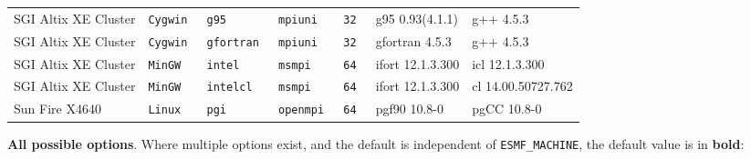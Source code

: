 \begin{tabular}{lllllll}
SGI Altix XE Cluster  &\tt Cygwin &\tt g95          &\tt mpiuni     &\tt 32              & g95 \footnotesize 0.93(4.1.1)      & g++  \footnotesize 4.5.3        \\ %
SGI Altix XE Cluster  &\tt Cygwin &\tt gfortran     &\tt mpiuni     &\tt 32              & gfortran \footnotesize 4.5.3       & g++  \footnotesize 4.5.3        \\ %
SGI Altix XE Cluster  &\tt MinGW  &\tt intel        &\tt msmpi      &\tt 64              & ifort \footnotesize 12.1.3.300     & icl  \footnotesize 12.1.3.300   \\ %
SGI Altix XE Cluster  &\tt MinGW  &\tt intelcl      &\tt msmpi      &\tt 64              & ifort \footnotesize 12.1.3.300     & cl \footnotesize 14.00.50727.762 \\ %
Sun Fire X4640        &\tt Linux  &\tt pgi          &\tt openmpi    &\tt 64              & pgf90 \footnotesize 10.8-0         & pgCC \footnotesize 10.8-0       \\ %
\end{tabular}

\vspace{1ex}

{\bf All possible options}. Where multiple options exist, and the default is independent
of {\tt ESMF\_MACHINE}, the default value is in {\bf bold}:

\vspace{1ex}


